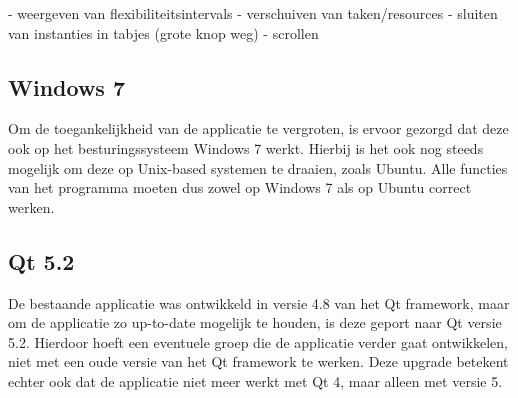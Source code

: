 - weergeven van flexibiliteitsintervals
- verschuiven van taken/resources
- sluiten van instanties in tabjes (grote knop weg)
- scrollen

\subsection{Windows 7}
Om de toegankelijkheid van de applicatie te vergroten, is ervoor gezorgd dat deze ook op het besturingssysteem Windows 7 werkt. Hierbij is het ook nog steeds mogelijk om deze op Unix-based systemen te draaien, zoals Ubuntu. Alle functies van het programma moeten dus zowel op Windows 7 als op Ubuntu correct werken.

\subsection{Qt 5.2}
De bestaande applicatie was ontwikkeld in versie 4.8 van het Qt framework, maar om de applicatie zo up-to-date mogelijk te houden, is deze geport naar Qt versie 5.2. Hierdoor hoeft een eventuele groep die de applicatie verder gaat ontwikkelen, niet met een oude versie van het Qt framework te werken. Deze upgrade betekent echter ook dat de applicatie niet meer werkt met Qt 4, maar alleen met versie 5.